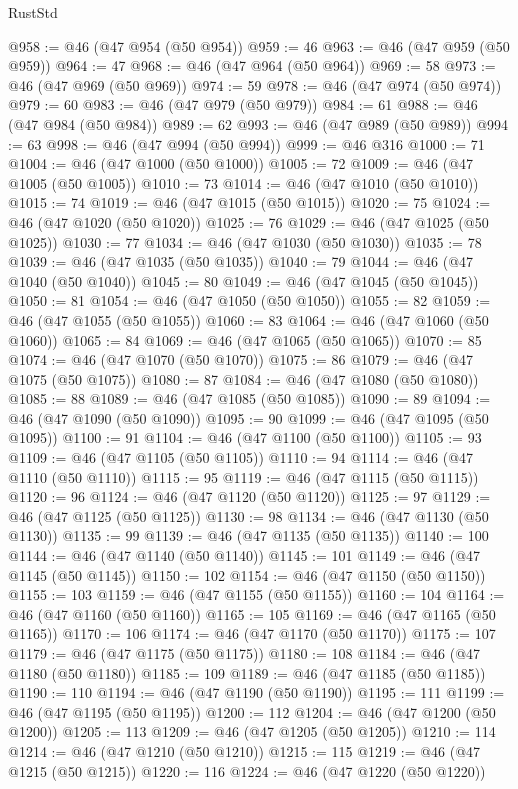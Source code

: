 \begin{lexlean}{RustStd}
\begin{coremodule}
@958 := @46 (@47 @954 (@50 @954))
@959 := 46
@963 := @46 (@47 @959 (@50 @959))
@964 := 47
@968 := @46 (@47 @964 (@50 @964))
@969 := 58
@973 := @46 (@47 @969 (@50 @969))
@974 := 59
@978 := @46 (@47 @974 (@50 @974))
@979 := 60
@983 := @46 (@47 @979 (@50 @979))
@984 := 61
@988 := @46 (@47 @984 (@50 @984))
@989 := 62
@993 := @46 (@47 @989 (@50 @989))
@994 := 63
@998 := @46 (@47 @994 (@50 @994))
@999 := @46 @316
@1000 := 71
@1004 := @46 (@47 @1000 (@50 @1000))
@1005 := 72
@1009 := @46 (@47 @1005 (@50 @1005))
@1010 := 73
@1014 := @46 (@47 @1010 (@50 @1010))
@1015 := 74
@1019 := @46 (@47 @1015 (@50 @1015))
@1020 := 75
@1024 := @46 (@47 @1020 (@50 @1020))
@1025 := 76
@1029 := @46 (@47 @1025 (@50 @1025))
@1030 := 77
@1034 := @46 (@47 @1030 (@50 @1030))
@1035 := 78
@1039 := @46 (@47 @1035 (@50 @1035))
@1040 := 79
@1044 := @46 (@47 @1040 (@50 @1040))
@1045 := 80
@1049 := @46 (@47 @1045 (@50 @1045))
@1050 := 81
@1054 := @46 (@47 @1050 (@50 @1050))
@1055 := 82
@1059 := @46 (@47 @1055 (@50 @1055))
@1060 := 83
@1064 := @46 (@47 @1060 (@50 @1060))
@1065 := 84
@1069 := @46 (@47 @1065 (@50 @1065))
@1070 := 85
@1074 := @46 (@47 @1070 (@50 @1070))
@1075 := 86
@1079 := @46 (@47 @1075 (@50 @1075))
@1080 := 87
@1084 := @46 (@47 @1080 (@50 @1080))
@1085 := 88
@1089 := @46 (@47 @1085 (@50 @1085))
@1090 := 89
@1094 := @46 (@47 @1090 (@50 @1090))
@1095 := 90
@1099 := @46 (@47 @1095 (@50 @1095))
@1100 := 91
@1104 := @46 (@47 @1100 (@50 @1100))
@1105 := 93
@1109 := @46 (@47 @1105 (@50 @1105))
@1110 := 94
@1114 := @46 (@47 @1110 (@50 @1110))
@1115 := 95
@1119 := @46 (@47 @1115 (@50 @1115))
@1120 := 96
@1124 := @46 (@47 @1120 (@50 @1120))
@1125 := 97
@1129 := @46 (@47 @1125 (@50 @1125))
@1130 := 98
@1134 := @46 (@47 @1130 (@50 @1130))
@1135 := 99
@1139 := @46 (@47 @1135 (@50 @1135))
@1140 := 100
@1144 := @46 (@47 @1140 (@50 @1140))
@1145 := 101
@1149 := @46 (@47 @1145 (@50 @1145))
@1150 := 102
@1154 := @46 (@47 @1150 (@50 @1150))
@1155 := 103
@1159 := @46 (@47 @1155 (@50 @1155))
@1160 := 104
@1164 := @46 (@47 @1160 (@50 @1160))
@1165 := 105
@1169 := @46 (@47 @1165 (@50 @1165))
@1170 := 106
@1174 := @46 (@47 @1170 (@50 @1170))
@1175 := 107
@1179 := @46 (@47 @1175 (@50 @1175))
@1180 := 108
@1184 := @46 (@47 @1180 (@50 @1180))
@1185 := 109
@1189 := @46 (@47 @1185 (@50 @1185))
@1190 := 110
@1194 := @46 (@47 @1190 (@50 @1190))
@1195 := 111
@1199 := @46 (@47 @1195 (@50 @1195))
@1200 := 112
@1204 := @46 (@47 @1200 (@50 @1200))
@1205 := 113
@1209 := @46 (@47 @1205 (@50 @1205))
@1210 := 114
@1214 := @46 (@47 @1210 (@50 @1210))
@1215 := 115
@1219 := @46 (@47 @1215 (@50 @1215))
@1220 := 116
@1224 := @46 (@47 @1220 (@50 @1220))

\end{coremodule}
\end{lexlean}
